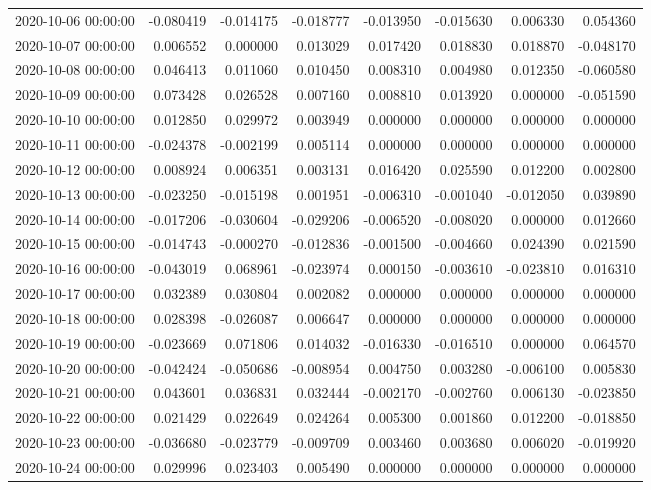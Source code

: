 \begin{tabular}{lrrrrrrr}
2020-10-06 00:00:00 & -0.080419 & -0.014175 & -0.018777 & -0.013950 & -0.015630 & 0.006330 & 0.054360 \\
2020-10-07 00:00:00 & 0.006552 & 0.000000 & 0.013029 & 0.017420 & 0.018830 & 0.018870 & -0.048170 \\
2020-10-08 00:00:00 & 0.046413 & 0.011060 & 0.010450 & 0.008310 & 0.004980 & 0.012350 & -0.060580 \\
2020-10-09 00:00:00 & 0.073428 & 0.026528 & 0.007160 & 0.008810 & 0.013920 & 0.000000 & -0.051590 \\
2020-10-10 00:00:00 & 0.012850 & 0.029972 & 0.003949 & 0.000000 & 0.000000 & 0.000000 & 0.000000 \\
2020-10-11 00:00:00 & -0.024378 & -0.002199 & 0.005114 & 0.000000 & 0.000000 & 0.000000 & 0.000000 \\
2020-10-12 00:00:00 & 0.008924 & 0.006351 & 0.003131 & 0.016420 & 0.025590 & 0.012200 & 0.002800 \\
2020-10-13 00:00:00 & -0.023250 & -0.015198 & 0.001951 & -0.006310 & -0.001040 & -0.012050 & 0.039890 \\
2020-10-14 00:00:00 & -0.017206 & -0.030604 & -0.029206 & -0.006520 & -0.008020 & 0.000000 & 0.012660 \\
2020-10-15 00:00:00 & -0.014743 & -0.000270 & -0.012836 & -0.001500 & -0.004660 & 0.024390 & 0.021590 \\
2020-10-16 00:00:00 & -0.043019 & 0.068961 & -0.023974 & 0.000150 & -0.003610 & -0.023810 & 0.016310 \\
2020-10-17 00:00:00 & 0.032389 & 0.030804 & 0.002082 & 0.000000 & 0.000000 & 0.000000 & 0.000000 \\
2020-10-18 00:00:00 & 0.028398 & -0.026087 & 0.006647 & 0.000000 & 0.000000 & 0.000000 & 0.000000 \\
2020-10-19 00:00:00 & -0.023669 & 0.071806 & 0.014032 & -0.016330 & -0.016510 & 0.000000 & 0.064570 \\
2020-10-20 00:00:00 & -0.042424 & -0.050686 & -0.008954 & 0.004750 & 0.003280 & -0.006100 & 0.005830 \\
2020-10-21 00:00:00 & 0.043601 & 0.036831 & 0.032444 & -0.002170 & -0.002760 & 0.006130 & -0.023850 \\
2020-10-22 00:00:00 & 0.021429 & 0.022649 & 0.024264 & 0.005300 & 0.001860 & 0.012200 & -0.018850 \\
2020-10-23 00:00:00 & -0.036680 & -0.023779 & -0.009709 & 0.003460 & 0.003680 & 0.006020 & -0.019920 \\
2020-10-24 00:00:00 & 0.029996 & 0.023403 & 0.005490 & 0.000000 & 0.000000 & 0.000000 & 0.000000 \\

\end{tabular}
